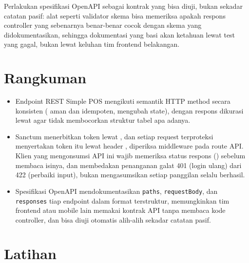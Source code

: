 \begin{tipbox}
Perlakukan spesifikasi OpenAPI sebagai kontrak yang bisa diuji, bukan
sekadar catatan pasif: alat seperti validator skema bisa memeriksa
apakah respons controller yang sebenarnya benar-benar cocok dengan
skema yang didokumentasikan, sehingga dokumentasi yang basi akan
ketahuan lewat test yang gagal, bukan lewat keluhan tim frontend
belakangan.
\end{tipbox}


\section{Rangkuman}
\label{sec:membangun-rest-api-rangkuman}

\begin{itemize}
  \item Endpoint REST Simple POS mengikuti semantik HTTP method secara
    konsisten ( aman dan idempoten,  mengubah
    state), dengan respons dikurasi lewat  agar
    tidak membocorkan struktur tabel apa adanya.
  \item Sanctum menerbitkan token lewat , dan
    setiap request terproteksi menyertakan token itu lewat header
    , diperiksa middleware
     pada route API. Klien yang mengonsumsi API ini
    wajib memeriksa status respons () sebelum
    membaca isinya, dan membedakan penanganan galat 401 (login ulang)
    dari 422 (perbaiki input), bukan mengasumsikan setiap panggilan
    selalu berhasil.
  \item Spesifikasi OpenAPI mendokumentasikan \texttt{paths},
    \texttt{requestBody}, dan \texttt{responses} tiap endpoint dalam
    format terstruktur, memungkinkan tim frontend atau mobile lain
    memakai kontrak API tanpa membaca kode controller, dan bisa diuji
    otomatis alih-alih sekadar catatan pasif.
\end{itemize}

\section{Latihan}

